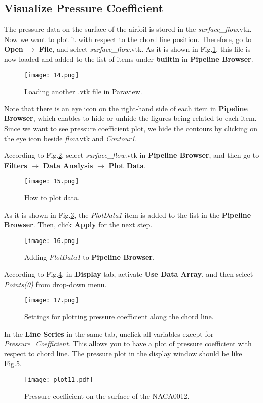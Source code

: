 \subsection{Visualize Pressure Coefficient}
The pressure data on the surface of the airfoil is stored in the \textit{surface\_flow}.vtk. Now we want to plot it with respect to the chord line position. Therefore, go to \textbf{Open} $\rightarrow$ \textbf{File}, and select \textit{surface\_flow}.vtk. As it is shown in Fig.\ref{fig:builtin}, this file is now loaded and added to the list of items under \textbf{builtin} in \textbf{Pipeline Browser}.
\begin{figure}[htbp]
    \centering
    \texttt{[image: 14.png]}
    \caption{Loading another .vtk file in Paraview.}
    \label{fig:builtin}
\end{figure}
Note that there is an eye icon on the right-hand side of each item in \textbf{Pipeline Browser}, which enables to hide or unhide the figures being related to each item. Since we want to see pressure coefficient plot, we hide the contours by clicking on the eye icon beside \textit{flow}.vtk and \textit{Contour1}. 

According to Fig.\ref{fig:plotdata}, select \textit{surface\_flow}.vtk in \textbf{Pipeline Browser}, and then go to \textbf{Filters} $\rightarrow$ \textbf{Data Analysis} $\rightarrow$ \textbf{Plot Data}. 
\begin{figure}[htbp]
    \centering
    \texttt{[image: 15.png]}
    \caption{How to plot data.}
    \label{fig:plotdata}
\end{figure}

As it is shown in Fig.\ref{fig:plotdata-list}, the \textit{PlotData1} item is added to the list in the \textbf{Pipeline Browser}. Then, click \textbf{Apply} for the next step.
\begin{figure}[htbp]
    \centering
    \texttt{[image: 16.png]}
    \caption{Adding \textit{PlotData1} to \textbf{Pipeline Browser}.}
    \label{fig:plotdata-list}
\end{figure}
According to Fig.\ref{fig:point(0)}, in \textbf{Display} tab, activate \textbf{Use Data Array}, and then select \textit{Points(0)} from drop-down menu. 
\begin{figure}[htbp]
    \centering
    \texttt{[image: 17.png]}
    \caption{Settings for plotting pressure coefficient along the chord line.}
    \label{fig:point(0)}
\end{figure}
In the \textbf{Line Series} in the same tab, unclick all variables except for \textit{Pressure\_Coefficient}. This allows you to have a plot of pressure coefficient with respect to chord line. The pressure plot in the display window should be like Fig.\ref{fig:surface_pressure}.
\begin{figure}[htbp]
    \centering
    \texttt{[image: plot11.pdf]}
    \caption{Pressure coefficient on the surface of the NACA0012.}
    \label{fig:surface_pressure}
\end{figure}

